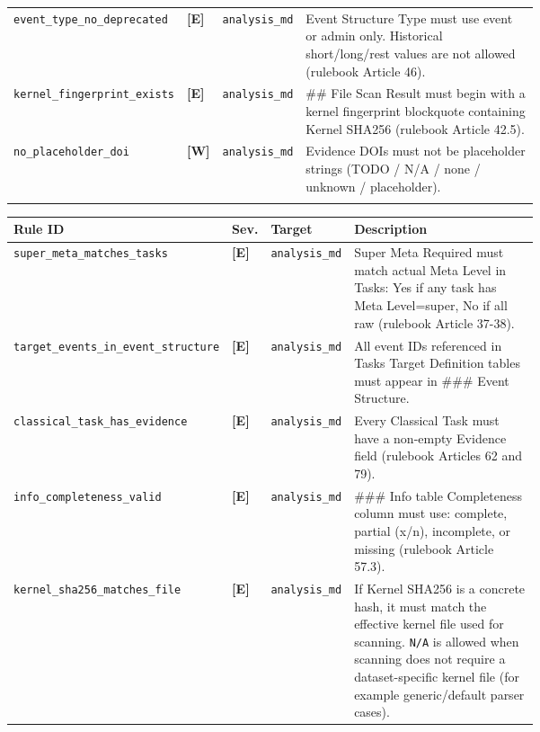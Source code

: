 \begin{tcolorbox}
\begin{tabular}{@{}p{0.22\linewidth}ll p{0.46\linewidth}@{}}
\addlinespace[1pt]
\texttt{event\_\allowbreak{}type\_\allowbreak{}no\_\allowbreak{}deprecated} & \textbf{[E]} & \texttt{analysis\_md} & Event Structure Type must use event or admin only. Historical short/long/rest values are not allowed (rulebook Article 46). \\
\addlinespace[1pt]
\texttt{kernel\_\allowbreak{}fingerprint\_\allowbreak{}exists} & \textbf{[E]} & \texttt{analysis\_md} & \#\# File Scan Result must begin with a kernel fingerprint blockquote containing Kernel SHA256 (rulebook Article 42.5). \\
\addlinespace[1pt]
\texttt{no\_\allowbreak{}placeholder\_\allowbreak{}doi} & \textbf{[W]} & \texttt{analysis\_md} & Evidence DOIs must not be placeholder strings (TODO / N/A / none / unknown / placeholder). \\
\addlinespace[1pt]
\bottomrule
\end{tabular}
\endgroup
\smallskip{}\par\smallskip
\begingroup\footnotesize
\begin{tabular}{@{}p{0.22\linewidth}ll p{0.46\linewidth}@{}}
\toprule
\textbf{Rule ID} & \textbf{Sev.} & \textbf{Target} & \textbf{Description} \\
\midrule
\texttt{super\_\allowbreak{}meta\_\allowbreak{}matches\_\allowbreak{}tasks} & \textbf{[E]} & \texttt{analysis\_md} & Super Meta Required must match actual Meta Level in Tasks: Yes if any task has Meta Level=super, No if all raw (rulebook Article 37-38). \\
\addlinespace[1pt]
\texttt{target\_\allowbreak{}events\_\allowbreak{}in\_\allowbreak{}event\_\allowbreak{}structure} & \textbf{[E]} & \texttt{analysis\_md} & All event IDs referenced in Tasks Target Definition tables must appear in \#\#\# Event Structure. \\
\addlinespace[1pt]
\texttt{classical\_\allowbreak{}task\_\allowbreak{}has\_\allowbreak{}evidence} & \textbf{[E]} & \texttt{analysis\_md} & Every Classical Task must have a non-empty Evidence field (rulebook Articles 62 and 79). \\
\addlinespace[1pt]
\texttt{info\_\allowbreak{}completeness\_\allowbreak{}valid} & \textbf{[E]} & \texttt{analysis\_md} & \#\#\# Info table Completeness column must use: complete, partial (x/n), incomplete, or missing (rulebook Article 57.3). \\
\addlinespace[1pt]
\texttt{kernel\_\allowbreak{}sha256\_\allowbreak{}matches\_\allowbreak{}file} & \textbf{[E]} & \texttt{analysis\_md} & If Kernel SHA256 is a concrete hash, it must match the effective kernel file used for scanning. \texttt{N/A} is allowed when scanning does not require a dataset-specific kernel file (for example generic/default parser cases). \\

\end{tabular}
\end{tcolorbox}

